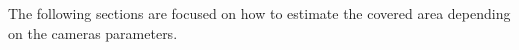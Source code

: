 

The following sections are focused on how to estimate the covered area depending on the cameras parameters.\\






